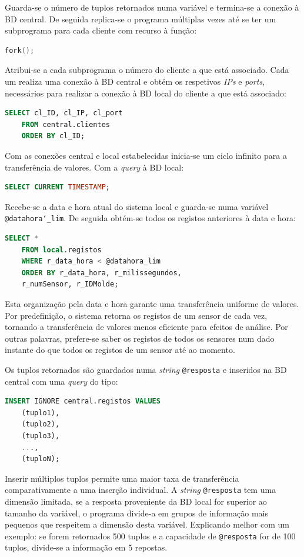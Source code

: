 \documentclass[11pt,twoside,a4paper]{report}
\begin{document}
Guarda-se o número de tuplos retornados numa variável e termina-se a conexão à BD central. De seguida replica-se o programa múltiplas vezes até se ter um subprograma para cada cliente com recurso à função:
\begin{lstlisting}[language = C]
	fork();
\end{lstlisting}
Atribui-se a cada subprograma o número do cliente a que está associado. Cada um realiza uma conexão à BD central e obtém os respetivos \textit{IPs} e \textit{ports}, necessários para realizar a conexão à BD local do cliente a que está associado:
\begin{lstlisting}[language = SQL]
	SELECT cl_ID, cl_IP, cl_port
	FROM central.clientes
	ORDER BY cl_ID;
\end{lstlisting}
Com as conexões central e local estabelecidas inicia-se um ciclo infinito para a transferência de valores. Com a \textit{query} à BD local:
\begin{lstlisting}[language = SQL]
	SELECT CURRENT TIMESTAMP;
\end{lstlisting}
Recebe-se a data e hora atual do sistema local e guarda-se numa variável \texttt{@datahora\char`_lim}. De seguida obtém-se todos os registos anteriores à data e hora:
\begin{lstlisting}[language = SQL]
	SELECT *
	FROM local.registos
	WHERE r_data_hora < @datahora_lim
	ORDER BY r_data_hora, r_milissegundos,
	r_numSensor, r_IDMolde;
\end{lstlisting}
Esta organização pela data e hora garante uma transferência uniforme de valores. Por predefinição, o sistema retorna os registos de um sensor de cada vez, tornando a transferência de valores menos eficiente para efeitos de análise. Por outras palavras, prefere-se saber os registos de todos os sensores num dado instante do que todos os registos de um sensor até ao momento.\par 
Os tuplos retornados são guardados numa \textit{string} \texttt{@resposta} e inseridos na BD central com uma \textit{query} do tipo:
\begin{lstlisting}[language = SQL]
	INSERT IGNORE central.registos VALUES
	(tuplo1),
	(tuplo2),
	(tuplo3),
	...,
	(tuploN);
\end{lstlisting}
Inserir múltiplos tuplos permite uma maior taxa de transferência comparativamente a uma inserção individual. A \textit{string} \texttt{@resposta} tem uma dimensão limitada, se a resposta proveniente da BD local for superior ao tamanho da variável, o programa divide-a em grupos de informação mais pequenos que respeitem a dimensão desta variável. Explicando melhor com um exemplo: se forem retornados 500 tuplos e a capacidade de \texttt{@resposta} for de 100 tuplos, divide-se a informação em 5 repostas.\par 
\end{document}
